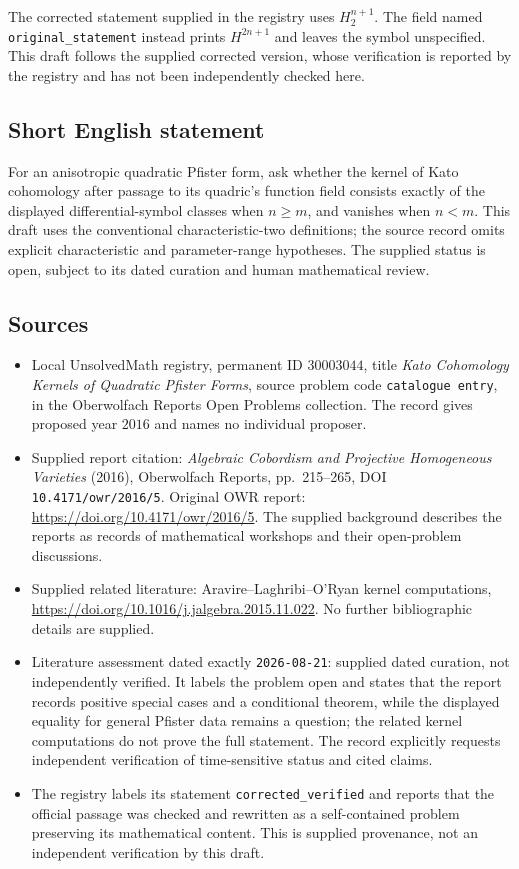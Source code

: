 \documentclass[11pt]{article}
\begin{document}
The corrected statement supplied in the registry uses \(H_2^{n+1}\). The field named \texttt{original\_statement} instead prints \(H^{2n+1}\) and leaves the symbol unspecified. This draft follows the supplied corrected version, whose verification is reported by the registry and has not been independently checked here.
\subsection{Short English statement}
For an anisotropic quadratic Pfister form, ask whether the kernel of Kato cohomology after passage to its quadric's function field consists exactly of the displayed differential-symbol classes when \(n\geq m\), and vanishes when \(n<m\). This draft uses the conventional characteristic-two definitions; the source record omits explicit characteristic and parameter-range hypotheses. The supplied status is open, subject to its dated curation and human mathematical review.
\subsection{Sources}
\begin{itemize}
\item Local UnsolvedMath registry, permanent ID \(30003044\), title \emph{Kato Cohomology Kernels of Quadratic Pfister Forms}, source problem code \texttt{catalogue entry}, in the Oberwolfach Reports Open Problems collection. The record gives proposed year \(2016\) and names no individual proposer.
\item Supplied report citation: \emph{Algebraic Cobordism and Projective Homogeneous Varieties} (2016), Oberwolfach Reports, pp.~215--265, DOI \texttt{10.4171/owr/2016/5}. Original OWR report: \url{https://doi.org/10.4171/owr/2016/5}. The supplied background describes the reports as records of mathematical workshops and their open-problem discussions.
\item Supplied related literature: Aravire--Laghribi--O'Ryan kernel computations, \url{https://doi.org/10.1016/j.jalgebra.2015.11.022}. No further bibliographic details are supplied.
\item Literature assessment dated exactly \texttt{2026-08-21}: supplied dated curation, not independently verified. It labels the problem open and states that the report records positive special cases and a conditional theorem, while the displayed equality for general Pfister data remains a question; the related kernel computations do not prove the full statement. The record explicitly requests independent verification of time-sensitive status and cited claims.
\item The registry labels its statement \texttt{corrected\_verified} and reports that the official passage was checked and rewritten as a self-contained problem preserving its mathematical content. This is supplied provenance, not an independent verification by this draft.
\end{itemize}
\end{document}
